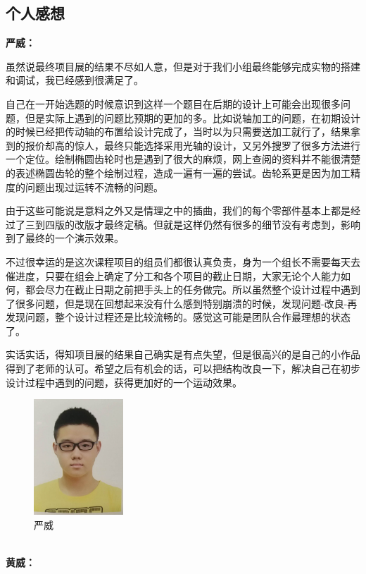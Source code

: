 \documentclass[12pt]{article}
\begin{document}
\begin{CJK}{UTF8}{gbsn}
\subsection{个人感想}
\textbf{严威：}\par
 
虽然说最终项目展的结果不尽如人意，但是对于我们小组最终能够完成实物的搭建和调试，我已经感到很满足了。\par
自己在一开始选题的时候意识到这样一个题目在后期的设计上可能会出现很多问题，但是实际上遇到的问题比预期的更加的多。比如说轴加工的问题，在初期设计的时候已经把传动轴的布置给设计完成了，当时以为只需要送加工就行了，结果拿到的报价却高的惊人，最终只能选择采用光轴的设计，又另外搜罗了很多方法进行一个定位。绘制椭圆齿轮时也是遇到了很大的麻烦，网上查阅的资料并不能很清楚的表述椭圆齿轮的整个绘制过程，造成一遍有一遍的尝试。齿轮系更是因为加工精度的问题出现过运转不流畅的问题。\par
由于这些可能说是意料之外又是情理之中的插曲，我们的每个零部件基本上都是经过了三到四版的改版才最终定稿。但就是这样仍然有很多的细节没有考虑到，影响到了最终的一个演示效果。\par
不过很幸运的是这次课程项目的组员们都很认真负责，身为一个组长不需要每天去催进度，只要在组会上确定了分工和各个项目的截止日期，大家无论个人能力如何，都会尽力在截止日期之前把手头上的任务做完。所以虽然整个设计过程中遇到了很多问题，但是现在回想起来没有什么感到特别崩溃的时候，发现问题-改良-再发现问题，整个设计过程还是比较流畅的。感觉这可能是团队合作最理想的状态了。\par
实话实话，得知项目展的结果自己确实是有点失望，但是很高兴的是自己的小作品得到了老师的认可。希望之后有机会的话，可以把结构改良一下，解决自己在初步设计过程中遇到的问题，获得更加好的一个运动效果。
\begin{figure}[H]
\centering
\includegraphics[width=0.3\textwidth]{photo//yw.jpg}
\caption{严威}
\end{figure}
~\\
\textbf{黄威：}\par


\end{CJK}
\end{document}
